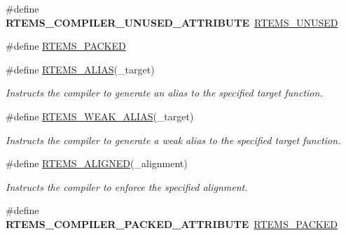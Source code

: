 \begin{DoxyCompactItemize}
\#define {\bfseries R\+T\+E\+M\+S\+\_\+\+C\+O\+M\+P\+I\+L\+E\+R\+\_\+\+U\+N\+U\+S\+E\+D\+\_\+\+A\+T\+T\+R\+I\+B\+U\+TE}~\mbox{\hyperlink{group__RTEMSScoreBaseDefs_ga6794c0ff237a90e837e19f9bbcae4297}{R\+T\+E\+M\+S\+\_\+\+U\+N\+U\+S\+ED}}
\item 
\#define \mbox{\hyperlink{group__RTEMSScoreBaseDefs_ga90b1bcc9c6d1a566ce5173321abfe1e2}{R\+T\+E\+M\+S\+\_\+\+P\+A\+C\+K\+ED}}
\item 
\mbox{\label{group__RTEMSScoreBaseDefs_gada1f742a2841d8377d3ee9a7e14f5946}} 
\#define \mbox{\hyperlink{group__RTEMSScoreBaseDefs_gada1f742a2841d8377d3ee9a7e14f5946}{R\+T\+E\+M\+S\+\_\+\+A\+L\+I\+AS}}(\+\_\+target)
\begin{DoxyCompactList}\small\item\em Instructs the compiler to generate an alias to the specified target function. \end{DoxyCompactList}\item 
\mbox{\label{group__RTEMSScoreBaseDefs_gaf77f4ad624eb043f05d061a86141fd99}} 
\#define \mbox{\hyperlink{group__RTEMSScoreBaseDefs_gaf77f4ad624eb043f05d061a86141fd99}{R\+T\+E\+M\+S\+\_\+\+W\+E\+A\+K\+\_\+\+A\+L\+I\+AS}}(\+\_\+target)
\begin{DoxyCompactList}\small\item\em Instructs the compiler to generate a weak alias to the specified target function. \end{DoxyCompactList}\item 
\mbox{\label{group__RTEMSScoreBaseDefs_ga41e14f706ba0f7e223367dffafec5ed8}} 
\#define \mbox{\hyperlink{group__RTEMSScoreBaseDefs_ga41e14f706ba0f7e223367dffafec5ed8}{R\+T\+E\+M\+S\+\_\+\+A\+L\+I\+G\+N\+ED}}(\+\_\+alignment)
\begin{DoxyCompactList}\small\item\em Instructs the compiler to enforce the specified alignment. \end{DoxyCompactList}\item 
\mbox{\label{group__RTEMSScoreBaseDefs_ga75cde4f1243aca94abed517676e1c48c}} 
\#define {\bfseries R\+T\+E\+M\+S\+\_\+\+C\+O\+M\+P\+I\+L\+E\+R\+\_\+\+P\+A\+C\+K\+E\+D\+\_\+\+A\+T\+T\+R\+I\+B\+U\+TE}~\mbox{\hyperlink{structRTEMS__PACKED}{R\+T\+E\+M\+S\+\_\+\+P\+A\+C\+K\+ED}}
\item 

\end{DoxyCompactItemize}
